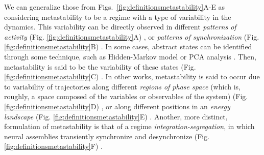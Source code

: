 \documentclass[reprint,superscriptaddress,showpacs,amsmath,amssymb,aps,floatfix,nolongbibliography]{revtex4-2}
\theoremstyle{definition}
\begin{document}
We can generalize those from Figs.~\ref{fig:definitionsmetastability}A-E as considering metastability to be a regime with a type of variability in the dynamics. This variability can be directly observed in different \textit{patterns of activity} (Fig. \ref{fig:definitionsmetastability}A) \cite{friston1997transients, friston2000transients, varela2001brainweb, roberts2019metastable}, or \textit{patterns of synchronization} (Fig. \ref{fig:definitionsmetastability}B) \cite{cabral2011role, deco2017dynamics, deco2016metastability, poncealvarez2015restingstate, aguilera2016extended}. In some cases, abstract states can be identified through some technique, such as Hidden-Markov model \cite{mazzucato2015dynamics, lacamera2019cortical, brinkman2022metastable} or PCA analysis \cite{sasaki2007metastability}. Then, metastability is said to be the variability of these states (Fig. \ref{fig:definitionsmetastability}C) \cite{mazzucato2015dynamics, lacamera2019cortical, afraimovich2010longrange, alderson2020metastable, lee2017linking, vasa2015effects, hellyer2014control, naik2017metastability, rabinovich2008transientcognitive, cavanna2018dynamic, werner2007metastability, bhowmik2013metastability}. In other works, metastability is said to occur due to variability of trajectories along different \textit{regions of phase space} (which is, roughly, a space composed of the variables or observables of the system) (Fig. \ref{fig:definitionsmetastability}D) \cite{hudson2017metastability, graben2019metastable}, or along different positions in an \textit{energy landscape} (Fig. \ref{fig:definitionsmetastability}E) \cite{gili2018metastable, cavanna2018dynamic, aguilera2016extended, hudson2017metastability}. Another, more distinct, formulation of metastability is that of a regime \textit{integration-segregation}, in which neural assemblies transiently synchronize and desynchronize (Fig. \ref{fig:definitionsmetastability}F) \cite{deco2015rethinking, fingelkurts2001operational, tognoli2014metastable, tognoli2014enlarging, bressler2016coordination, kelso2012multistability, hellyer2015cognitive}. 
\end{document}
